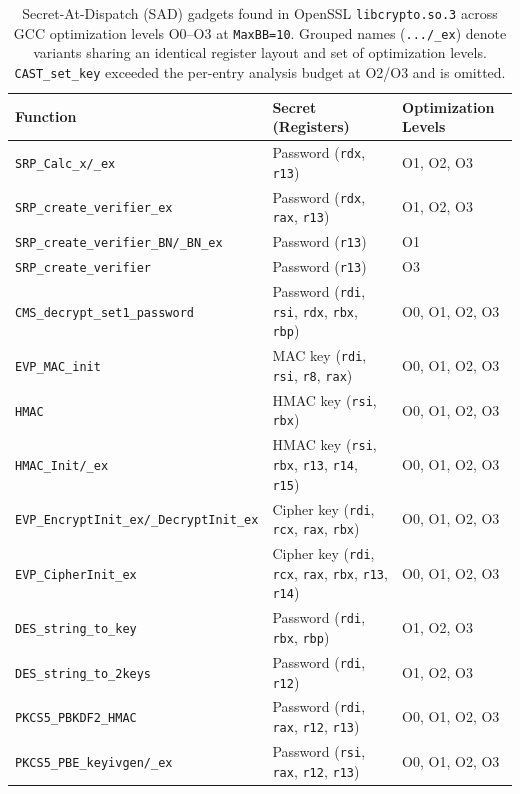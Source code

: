 \begin{table}[h]
\small\centering
\caption{Secret-At-Dispatch (SAD) gadgets found in OpenSSL \texttt{libcrypto.so.3} across GCC optimization levels O0--O3 at \texttt{MaxBB=10}. Grouped names (\texttt{.../\_ex}) denote variants sharing an identical register layout and set of optimization levels. \texttt{CAST\_set\_key} exceeded the per-entry analysis budget at O2/O3 and is omitted.}
\label{tab:sad_gadgets}
\begin{tabular}{@{}lll@{}}
\toprule
\textbf{Function} & \textbf{Secret (Registers)} & \textbf{Optimization Levels} \\ \midrule
\texttt{SRP\_Calc\_x/\_ex} & Password (\texttt{rdx}, \texttt{r13}) & O1, O2, O3 \\
\texttt{SRP\_create\_verifier\_ex} & Password (\texttt{rdx}, \texttt{rax}, \texttt{r13}) & O1, O2, O3 \\
\texttt{SRP\_create\_verifier\_BN/\_BN\_ex} & Password (\texttt{r13}) & O1 \\
\texttt{SRP\_create\_verifier} & Password (\texttt{r13}) & O3 \\
\texttt{CMS\_decrypt\_set1\_password} & Password (\texttt{rdi}, \texttt{rsi}, \texttt{rdx}, \texttt{rbx}, \texttt{rbp}) & O0, O1, O2, O3 \\
\texttt{EVP\_MAC\_init} & MAC key (\texttt{rdi}, \texttt{rsi}, \texttt{r8}, \texttt{rax}) & O0, O1, O2, O3 \\
\texttt{HMAC} & HMAC key (\texttt{rsi}, \texttt{rbx}) & O0, O1, O2, O3 \\
\texttt{HMAC\_Init/\_ex} & HMAC key (\texttt{rsi}, \texttt{rbx}, \texttt{r13}, \texttt{r14}, \texttt{r15}) & O0, O1, O2, O3 \\
\texttt{EVP\_EncryptInit\_ex/\_DecryptInit\_ex} & Cipher key (\texttt{rdi}, \texttt{rcx}, \texttt{rax}, \texttt{rbx}) & O0, O1, O2, O3 \\
\texttt{EVP\_CipherInit\_ex} & Cipher key (\texttt{rdi}, \texttt{rcx}, \texttt{rax}, \texttt{rbx}, \texttt{r13}, \texttt{r14}) & O0, O1, O2, O3 \\
\texttt{DES\_string\_to\_key} & Password (\texttt{rdi}, \texttt{rbx}, \texttt{rbp}) & O1, O2, O3 \\
\texttt{DES\_string\_to\_2keys} & Password (\texttt{rdi}, \texttt{r12}) & O1, O2, O3 \\
\texttt{PKCS5\_PBKDF2\_HMAC} & Password (\texttt{rdi}, \texttt{rax}, \texttt{r12}, \texttt{r13}) & O0, O1, O2, O3 \\
\texttt{PKCS5\_PBE\_keyivgen/\_ex} & Password (\texttt{rsi}, \texttt{rax}, \texttt{r12}, \texttt{r13}) & O0, O1, O2, O3 \\

\end{tabular}
\end{table}

